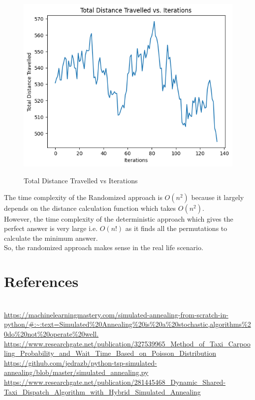 \documentclass{article}
\begin{document}
\begin{figure}[h]
\centering
{\includegraphics[width = 5in]{Total_Distance_Travelled_vs_Iterations.png}}  
\caption{Total Distance Travelled vs Iterations}
\label{some example}
\end{figure}

The time complexity of the Randomized approach is $O(n^2)$ because it largely depends on the distance calculation function which takes $O(n^2)$. \\

However, the time complexity of the deterministic approach which gives the perfect answer is very large i.e. $O(n!)$ as it finds all the permutations to calculate the minimum answer. \\

So, the randomized approach makes sense in the real life scenario.

\newpage
\section{References}
\\
\url{https://machinelearningmastery.com/simulated-annealing-from-scratch-in-python/#:~:text=Simulated%20Annealing%20is%20a%20stochastic,algorithms%20do%20not%20operate%20well.} \\

\url{https://www.researchgate.net/publication/327539965_Method_of_Taxi_Carpooling_Probability_and_Wait_Time_Based_on_Poisson_Distribution} \\

\url{https://github.com/jedrazb/python-tsp-simulated-annealing/blob/master/simulated_annealing.py} \\

\url{https://www.researchgate.net/publication/281445468_Dynamic_Shared-Taxi_Dispatch_Algorithm_with_Hybrid_Simulated_Annealing}
\end{document}
